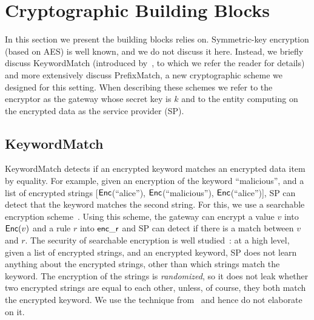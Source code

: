 


\section{Cryptographic Building Blocks}
\label{sec:buildingblocks}

In this section we present the building blocks \sys relies on.
Symmetric-key encryption (based on AES) is well known, and we do not discuss it here. Instead, we briefly discuss KeywordMatch (introduced by~\cite{blindbox}, to which we refer the reader for details) and more extensively discuss PrefixMatch, a new cryptographic scheme we designed for this setting.
When describing these schemes we refer to the encryptor as the gateway whose secret key is $k$ and to the entity computing on the encrypted data as the service provider (SP).


\subsection{KeywordMatch}\label{s:kwmatch}


KeywordMatch detects if an encrypted keyword matches an encrypted data item by equality.
For example, given an encryption of the keyword ``malicious'', and a list of encrypted strings  [$\mathsf{Enc}$(``alice''), $\mathsf{Enc}$(``malicious''), $\mathsf{Enc}$(``alice'')], SP can  detect that the keyword matches the second string. 
For  this, we use a searchable encryption scheme~\cite{song:search, blindbox}.
Using this scheme, the gateway can encrypt a value $v$ into $\mathsf{Enc}(v)$ and a rule $r$ into $\mathsf{enc\_r}$ and SP can detect if there is a match between $v$ and $r$. 
 The security of searchable encryption is well studied~\cite{song:search, blindbox}: at a high level,  given a list of encrypted strings, and an encrypted keyword, SP does not learn anything about the encrypted strings, other than which strings match the keyword. 
 The encryption of the strings is {\em randomized}, so it does not leak whether two encrypted strings are equal to each other, unless, of course, they both match the encrypted keyword. 
  We use the technique from~\cite{blindbox} and hence do not elaborate on it.


